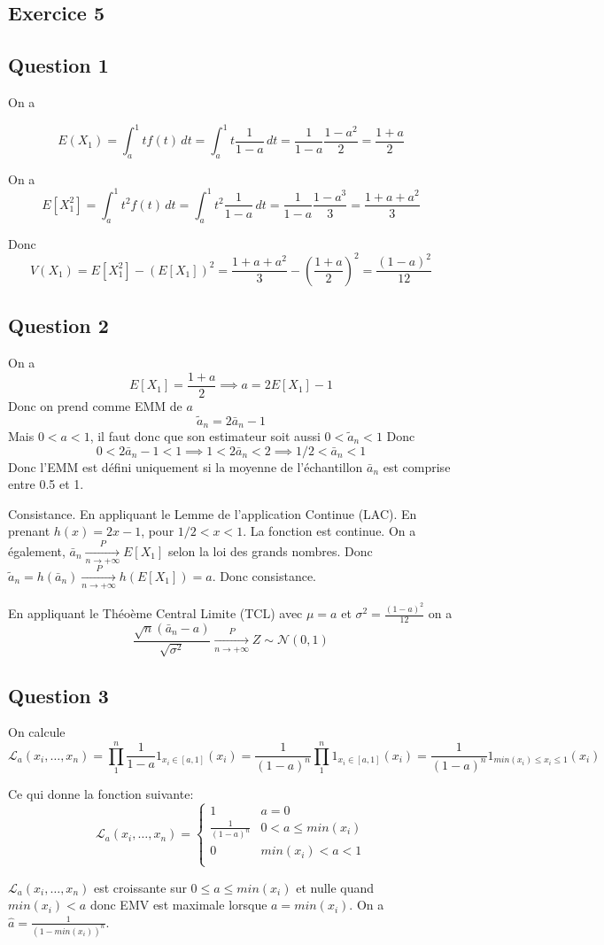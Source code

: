 \documentclass[]{book}
\theoremstyle{definition}
\begin{document}
\subsection*{Exercice 5}
\subsection*{Question 1}
On a

$$
E(X_1) = \int_{a}^{1}{t f(t) \,dt} = \int_{a}^{1}{t\frac{1}{1-a} \,dt} = \frac{1}{1-a}\frac{1-a^2}{2} = \frac{1+a}{2}
$$

On a
$$
E[X_1^2] = \int_{a}^{1}{t^2 f(t) \,dt} = \int_{a}^{1}{t^2\frac{1}{1-a} \,dt} = \frac{1}{1-a}\frac{1-a^3}{3} = \frac{1+a+a^2}{3}
$$

Donc
$$
V(X_1) = E[X_1^2]−(E[X_1])^2 = \frac{1+a+a^2}{3} -  \left( \frac{1+a}{2} \right)^2 = \frac{(1-a)^2}{12}
$$

\subsection*{Question 2}
On a
$$E[X_1] = \frac{1+a}{2} \implies a = 2E[X_1] - 1$$
Donc on prend comme EMM de $a$
$$
\tilde{a}_n = 2 \bar{a}_n - 1
$$
Mais $0 < a <1$, il faut donc que son estimateur soit aussi $0 < \tilde{a}_n <1$
Donc 
$$
0 < 2\bar{a}_n - 1 < 1 \implies 1 < 2\bar{a}_n < 2 \implies 1/2 < \bar{a}_n < 1
$$
Donc l'EMM est d\'efini uniquement si la moyenne de l'\'echantillon $\bar{a}_n$ est comprise entre 0.5 et 1. 

Consistance. En appliquant le Lemme de l'application Continue (LAC).
En prenant $h(x) = 2 x - 1$, pour $1/2 < x <1$. La fonction est continue. On a \'egalement, $\bar{a}_n \xrightarrow[n \to +\infty]{P} E[X_1]$ selon la loi des grands nombres. Donc $\tilde{a}_n = h(\bar{a}_n) \xrightarrow[n \to +\infty]{P} h(E[X_1]) = a$. Donc consistance.

En appliquant le Th\'eo\`eme Central Limite (TCL) avec $\mu = a$ et $\sigma^2 = \frac{(1-a)^2}{12}$ on a  
$$
\frac{\sqrt{n}(\bar{a}_n - a)}{\sqrt{\sigma^2}} \xrightarrow[n \to +\infty]{P} Z \sim \mathcal{N}(0,1)
$$

\subsection*{Question 3}
On calcule
$$
\mathcal{L}_a(x_i,\ldots,x_n) = \prod_{1}^{n}{\frac{1}{1-a}}1_{x_i \in [a,1]}(x_i) =
\frac{1}{(1-a)^n}\prod_{1}^{n}{1_{x_i \in [a,1]}(x_i)} = \frac{1}{(1-a)^n}{1_{min(x_i) \leq x_i \leq 1}(x_i)}
$$

Ce qui donne la fonction suivante:
$$
\mathcal{L}_a(x_i,\ldots,x_n) =     
\left\{
    \begin{array}{cc}
        1 &  a = 0 \\
        \frac{1}{(1-a)^n} & 0 < a \leq min(x_i)\\
        0 & min(x_i) < a < 1 \\
    \end{array}
\right.
$$ 

$\mathcal{L}_a(x_i,\ldots,x_n)$ est croissante sur $0 \leq a \leq min(x_i)$ et nulle quand $min(x_i) < a$ donc EMV est maximale lorsque $a=min(x_i)$. On a $\hat{a} = \frac{1}{(1-min(x_i))^n}$.  
\end{document}
